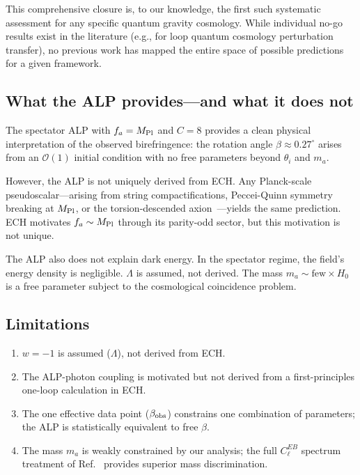 \documentclass[aps,prd,twocolumn,superscriptaddress,showpacs,preprintnumbers,nofootinbib,longbibliography,floatfix]{revtex4-2}
\newcommand{\MPl}{M_{\rm Pl}}
\begin{document}
This comprehensive closure is, to our knowledge, the first such systematic
assessment for any specific quantum gravity cosmology.  While individual
no-go results exist in the literature (e.g., for loop quantum cosmology
perturbation transfer), no previous work has mapped the entire space of
possible predictions for a given framework.

\subsection{What the ALP provides---and what it does not}

The spectator ALP with $f_a = \MPl$ and $C = 8$ provides a clean physical
interpretation of the observed birefringence: the rotation angle
$\beta \approx 0.27^\circ$ arises from an $\mathcal{O}(1)$ initial condition
with no free parameters beyond $\theta_i$ and $m_a$.

However, the ALP is not uniquely derived from ECH.  Any Planck-scale
pseudoscalar---arising from string compactifications, Peccei-Quinn
symmetry breaking at $\MPl$, or the torsion-descended
axion~\cite{CastilloFelisola2015}---yields the same prediction.  ECH
motivates $f_a \sim \MPl$ through its parity-odd sector, but this
motivation is not unique.

The ALP also does not explain dark energy.  In the spectator regime, the
field's energy density is negligible.  $\Lambda$ is assumed, not derived.
The mass $m_a \sim \mathrm{few} \times H_0$ is a free parameter subject to
the cosmological coincidence problem.

\subsection{Limitations}

\begin{enumerate}[leftmargin=*]
\item $w = -1$ is assumed ($\Lambda$), not derived from ECH.
\item The ALP-photon coupling is motivated but not derived from a first-principles one-loop calculation in ECH.
\item The one effective data point ($\beta_{\rm obs}$) constrains one combination of parameters; the ALP is statistically equivalent to free $\beta$.
\item The mass $m_a$ is weakly constrained by our analysis; the full $C_\ell^{EB}$ spectrum treatment of Ref.~\cite{Namikawa2025} provides superior mass discrimination.
\end{enumerate}
\end{document}
